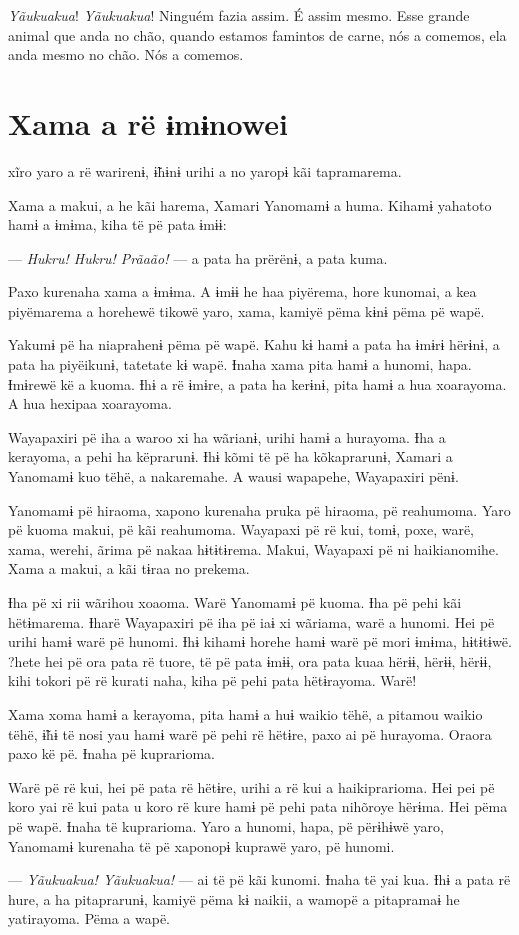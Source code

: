 \textit{Yãukuakua}! \textit{Yãukuakua}! Ninguém fazia assim. É assim mesmo. Esse
grande animal que anda no chão, quando estamos famintos de carne, nós a
comemos, ela anda mesmo no chão. Nós a comemos. 

\chapter{Xama a rë ɨmɨnowei}
 
 xĩro yaro a rë warirenɨ, ɨ̃hɨnɨ urihi a no yaropɨ kãi tapramarema. 

Xama a makui, a he kãi harema, Xamari Yanomamɨ a huma. Kihamɨ yahatoto
hamɨ a ɨmɨma, kiha të pë pata ɨmɨɨ: 

--- \textit{Hukru! Hukru! Prãaão!} --- a pata ha prërënɨ, a pata kuma. 

Paxo kurenaha xama a ɨmɨma. A ɨmɨɨ he haa piyërema, hore kunomai, a kea
piyëmarema a horehewë tikowë yaro, xama, kamiyë pëma kɨnɨ pëma pë wapë. 

Yakumɨ pë ha niaprahenɨ pëma pë wapë. Kahu kɨ hamɨ a pata ha ɨmɨrɨ
hërɨnɨ, a pata ha piyëikunɨ, tatetate kɨ wapë. Ɨnaha xama pita hamɨ a
hunomi, hapa. Ɨmɨrewë kë a kuoma. Ɨhɨ a rë ɨmɨre, a pata ha kerɨnɨ, pita
hamɨ a hua xoarayoma. A hua hexipaa xoarayoma. 

Wayapaxiri pë iha a waroo xi ha wãrianɨ, urihi hamɨ a hurayoma. Ɨha a
kerayoma, a pehi ha këprarunɨ. Ɨhɨ kõmi të pë ha kõkaprarunɨ, Xamari a
Yanomamɨ kuo tëhë, a nakaremahe. A wausi wapapehe, Wayapaxiri pënɨ.

 Yanomamɨ pë hiraoma, xapono kurenaha pruka pë hiraoma, pë reahumoma.
Yaro pë kuoma makui, pë kãi reahumoma. Wayapaxi pë rë kui, tomɨ, poxe,
warë, xama, werehi, ãrima pë nakaa hɨtɨtɨrema. Makui, Wayapaxi pë ni
haikianomihe. Xama a makui, a kãi tɨraa no prekema. 

Ɨha pë xi rii wãrihou xoaoma. Warë Yanomamɨ pë kuoma. Ɨha pë pehi kãi
hëtɨmarema. Ɨharë Wayapaxiri pë iha pë iaɨ xi wãriama, warë a hunomi.
Hei pë urihi hamɨ warë pë hunomi. Ɨhɨ kihamɨ horehe hamɨ warë pë mori
ɨmɨma, hɨtɨtɨwë. ?hete hei pë ora pata rë tuore, të pë pata ɨmɨɨ, ora
pata kuaa hërɨɨ, hërɨɨ, hërɨɨ, kihi tokori pë rë kurati naha, kiha pë
pehi pata hëtɨrayoma. Warë! 

Xama xoma hamɨ a kerayoma, pita hamɨ a huɨ waikio tëhë, a pitamou waikio
tëhë, ɨ̃hɨ të nosi yau hamɨ warë pë pehi rë hëtɨre, paxo ai pë hurayoma.
Oraora paxo kë pë. Ɨnaha pë kuprarioma. 

Warë pë rë kui, hei pë pata rë hëtɨre, urihi a rë kui a haikiprarioma.
Hei pei pë koro yai rë kui pata u koro rë kure hamɨ pë pehi pata
nihõroye hërɨma. Hei pëma pë wapë. Ɨnaha të kuprarioma. Yaro a hunomi,
hapa, pë përɨhɨwë yaro, Yanomamɨ kurenaha të pë xaponopɨ kuprawë yaro,
pë hunomi. 

--- \textit{Yãukuakua! Yãukuakua!} --- ai të pë kãi kunomi. Ɨnaha të yai kua. Ɨhɨ a
pata rë hure, a ha pitaprarunɨ, kamiyë pëma kɨ naikii, a wamopë a
pitapramaɨ he yatirayoma. Pëma a wapë. 
